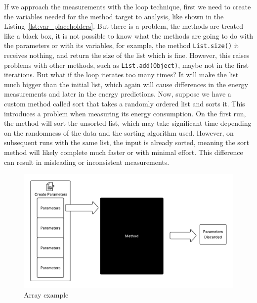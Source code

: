 If we approach the measurements with the loop technique, first we need to create the variables needed for the method target to analysis, like shown in the Listing~\ref{lst:var_placeholders}. But there is a problem, the methods are treated like a black box, it is not possible to know what the methods are going to do with the parameters or with its variables, for example, the method \texttt{List.size()} it receives nothing, and return the size of the list which is fine. However, this raises problems with other methods, such as \texttt{List.add(Object)}, maybe not in the first iterations. But what if the loop iterates too many times? It will make the list much bigger than the initial list, which again will cause differences in the energy measurements and later in the energy predictions. 
Now, suppose we have a custom method called sort that takes a randomly ordered list and sorts it. This introduces a problem when measuring its energy consumption. On the first run, the method will sort the unsorted list, which may take significant time depending on the randomness of the data and the sorting algorithm used. However, on subsequent runs with the same list, the input is already sorted, meaning the sort method will likely complete much faster or with minimal effort. This difference can result in misleading or inconsistent measurements.

\begin{figure}[htbp]
  \centering
  \includegraphics[width = 1 \textwidth]{figures/array.pdf}
  \caption{Array example}
  \label{fig:array}
\end{figure}

